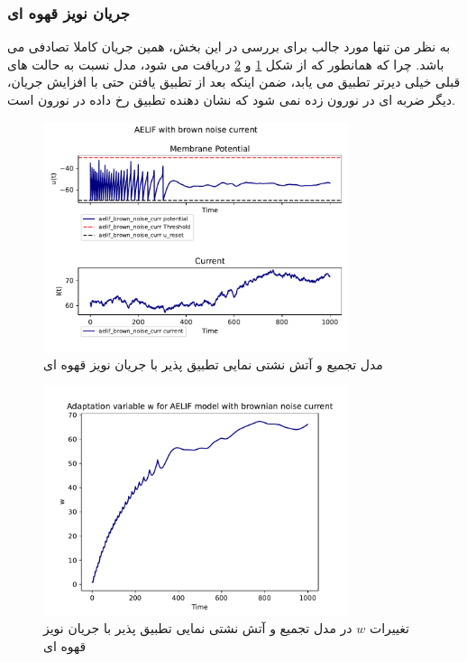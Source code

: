 \documentclass{article}
\begin{document}
            \subsubsection{جریان نویز قهوه ای}
                به نظر من تنها مورد جالب برای بررسی در این بخش، همین جریان کاملا تصادفی می باشد. چرا که همانطور که از شکل
                \ref{fig:aelif-brownian-noise-curr} و 
                \ref{fig:aelif-w-brownian-noise-curr}
                دریافت می شود، مدل نسبت به حالت های قبلی خیلی دیرتر تطبیق می یابد، ضمن اینکه بعد از تطبیق یافتن حتی با افزایش جریان، دیگر ضربه ای در نورون زده نمی شود که نشان دهنده تطبیق رخ داده در نورون است.
                \begin{figure}[H]
                    \centering
                    \includegraphics[width=0.8\textwidth]{plots/AELIF with brown noise current.pdf} 
                    \caption{مدل تجمیع و آتش نشتی نمایی تطبیق پذیر با جریان نویز قهوه ای  }
                    \label{fig:aelif-brownian-noise-curr}
                \end{figure}
                \begin{figure}[H]
                    \centering
                    \includegraphics[width=0.8\textwidth]{plots/Adaptation variable w for AELIF model with brownian noise current.pdf} 
                    \caption{تغییرات $w$ در مدل تجمیع و آتش نشتی نمایی تطبیق پذیر با جریان نویز قهوه ای}
                    \label{fig:aelif-w-brownian-noise-curr}
                \end{figure}
\newpage
\end{document}
